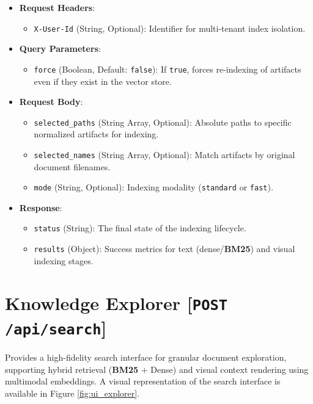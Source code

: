 \begin{itemize}
    \item \textbf{Request Headers}:
    \begin{itemize}
        \item \texttt{X-User-Id} (String, Optional): Identifier for multi-tenant index isolation.
    \end{itemize}
    \item \textbf{Query Parameters}:
    \begin{itemize}
        \item \texttt{force} (Boolean, Default: \texttt{false}): If \texttt{true}, forces re-indexing of artifacts even if they exist in the vector store.
    \end{itemize}
    \item \textbf{Request Body}:
    \begin{itemize}
        \item \texttt{selected\_paths} (String Array, Optional): Absolute paths to specific normalized artifacts for indexing.
        \item \texttt{selected\_names} (String Array, Optional): Match artifacts by original document filenames. 
        \item \texttt{mode} (String, Optional): Indexing modality (\texttt{standard} or \texttt{fast}).
    \end{itemize}
    \item \textbf{Response}:
    \begin{itemize}
        \item \texttt{status} (String): The final state of the indexing lifecycle.
        \item \texttt{results} (Object): Success metrics for text (dense/\textbf{BM25}) and visual indexing stages.
    \end{itemize}
\end{itemize}

\section*{Knowledge Explorer [\texttt{POST} \texttt{/api/search}]}
Provides a high-fidelity search interface for granular document exploration, supporting hybrid retrieval (\textbf{BM25} + Dense) and visual context rendering using multimodal embeddings. A visual representation of the search interface is available in Figure \ref{fig:ui_explorer}.

